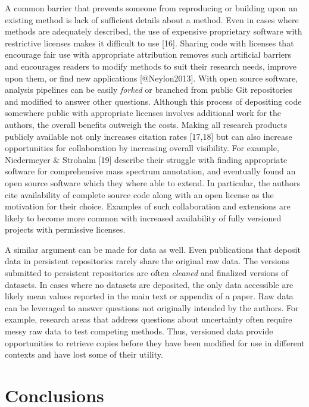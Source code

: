 \documentclass[]{article}
\begin{document}
A common barrier that prevents someone from reproducing or building upon
an existing method is lack of sufficient details about a method. Even in
cases where methods are adequately described, the use of expensive
proprietary software with restrictive licenses makes it difficult to use
{[}16{]}. Sharing code with licenses that encourage fair use with
appropriate attribution removes such artificial barriers and encourages
readers to modify methods to suit their research needs, improve upon
them, or find new applications {[}@Neylon2013{]}. With open source
software, analysis pipelines can be easily \emph{forked} or branched
from public Git repositories and modified to answer other questions.
Although this process of depositing code somewhere public with
appropriate licenses involves additional work for the authors, the
overall benefits outweigh the costs. Making all research products
publicly available not only increases citation rates {[}17,18{]} but can
also increase opportunities for collaboration by increasing overall
visibility. For example, Niedermeyer \& Strohalm {[}19{]} describe their
struggle with finding appropriate software for comprehensive mass
spectrum annotation, and eventually found an open source software which
they where able to extend. In particular, the authors cite availability
of complete source code along with an open license as the motivation for
their choice. Examples of such collaboration and extensions are likely
to become more common with increased availability of fully versioned
projects with permissive licenses.

A similar argument can be made for data as well. Even publications that
deposit data in persistent repositories rarely share the original raw
data. The versions submitted to persistent repositories are often
\emph{cleaned} and finalized versions of datasets. In cases where no
datasets are deposited, the only data accessible are likely mean values
reported in the main text or appendix of a paper. Raw data can be
leveraged to answer questions not originally intended by the authors.
For example, research areas that address questions about uncertainty
often require messy raw data to test competing methods. Thus, versioned
data provide opportunities to retrieve copies before they have been
modified for use in different contexts and have lost some of their
utility.

\section{Conclusions}
\end{document}
